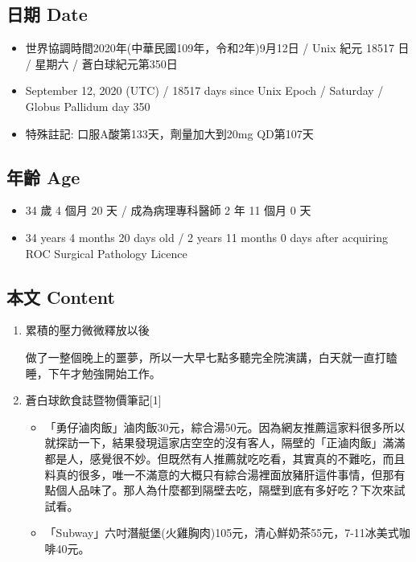 \documentclass[
]{article}
\providecommand{\tightlist}{%
  \setlength{\itemsep}{0pt}\setlength{\parskip}{0pt}}
\begin{document}
\hypertarget{ux65e5ux671f-date-11}{%
\subsection{日期 Date}\label{ux65e5ux671f-date-11}}

\begin{itemize}
\tightlist
\item
  世界協調時間2020年(中華民國109年，令和2年)9月12日 / Unix 紀元 18517 日
  / 星期六 / 蒼白球紀元第350日
\item
  September 12, 2020 (UTC) / 18517 days since Unix Epoch / Saturday /
  Globus Pallidum day 350
\item
  特殊註記: 口服A酸第133天，劑量加大到20mg QD第107天
\end{itemize}

\hypertarget{ux5e74ux9f61-age-11}{%
\subsection{年齡 Age}\label{ux5e74ux9f61-age-11}}

\begin{itemize}
\tightlist
\item
  34 歲 4 個月 20 天 / 成為病理專科醫師 2 年 11 個月 0 天
\item
  34 years 4 months 20 days old / 2 years 11 months 0 days after
  acquiring ROC Surgical Pathology Licence
\end{itemize}

\hypertarget{ux672cux6587-content-11}{%
\subsection{本文 Content}\label{ux672cux6587-content-11}}

\begin{enumerate}
\def\labelenumi{\arabic{enumi}.}
\item
  累積的壓力微微釋放以後

  做了一整個晚上的噩夢，所以一大早七點多聽完全院演講，白天就一直打瞌睡，下午才勉強開始工作。
\item
  蒼白球飲食誌暨物價筆記{[}1{]}

  \begin{itemize}
  \tightlist
  \item
    「勇仔滷肉飯」滷肉飯30元，綜合湯50元。因為網友推薦這家料很多所以就探訪一下，結果發現這家店空空的沒有客人，隔壁的「正滷肉飯」滿滿都是人，感覺很不妙。但既然有人推薦就吃吃看，其實真的不難吃，而且料真的很多，唯一不滿意的大概只有綜合湯裡面放豬肝這件事情，但那有點個人品味了。那人為什麼都到隔壁去吃，隔壁到底有多好吃？下次來試試看。
  \item
    「Subway」六吋潛艇堡(火雞胸肉)105元，清心鮮奶茶55元，7-11冰美式咖啡40元。
  \end{itemize}
\end{enumerate}
\end{document}
